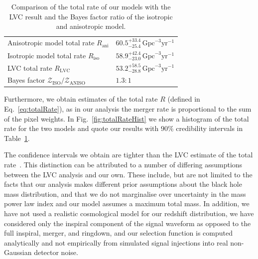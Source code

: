 \documentclass[usenatbib,useAMS]{mnras}
\begin{document}
% 
\begin{table}
    \centering
    \begin{tabular}{l l}
    \hline\hline 
    Anisotropic model total rate ${R}_{\mathrm{ani}}$ &
    $60.5^{+33.4}_{-25.4}\,\mathrm{Gpc}^{-3}\mathrm{yr}^{-1}$\\[0.3ex]
    Isotropic model total rate ${R}_{\mathrm{iso}}$ &
    $58.9^{+42.4}_{-23.0}\,\mathrm{Gpc}^{-3}\mathrm{yr}^{-1}$\\[0.3ex]
    LVC total rate $R_{\mathrm{LVC}}$&
    $53.2^{+58.5}_{-28.8}\,\mathrm{Gpc}^{-3}\mathrm{yr}^{-1}$\\[0.3ex]
    Bayes factor $\mathcal{Z}_{\text{ISO}}/\mathcal{Z}_{\text{ANISO}}$ & $1.3:1$\\
    \hline\hline
    \end{tabular}
    \caption{Comparison of the total rate of our models with the LVC result
    and the Bayes factor ratio of the isotropic and anisotropic model.}
\label{table:results}
\end{table}

Furthermore, we obtain estimates of the total rate $R$ (defined in
Eq.~\ref{eq:totalRate}), as in our analysis the merger rate is proportional
to the sum of the pixel weights. In Fig.~\ref{fig:totalRateHist} we show a histogram of
the total rate for the two models and quote our results with $90\%$ credibility
intervals in Table~\ref{table:results}.

The confidence intervals we obtain are tighter than the LVC estimate of the total
rate~\citep{O2populations}. This distinction can be attributed to a number of differing
assumptions between the LVC analysis and our own. These include, but are not
limited to the facts that our analysis makes different prior assumptions about
the black hole mass distribution, and that we do not marginalise over
uncertainty in the mass power law index and our model assumes a maximum total
mass. In addition, we have not used a realistic cosmological model for our
redshift distribution, we have considered only the inspiral component of the
signal waveform as opposed to the full inspiral, merger, and ringdown, and our
selection function is computed analytically and not empirically from simulated
signal injections into real non-Gaussian detector noise.
\end{document}
